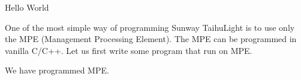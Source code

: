 Hello World

One of the most simple way of programming Sunway TaihuLight is to use only the
MPE
(Management Processing Element).
The MPE can be programmed in vanilla C/C++. Let us first write some program
that run on MPE.




We have programmed MPE.
